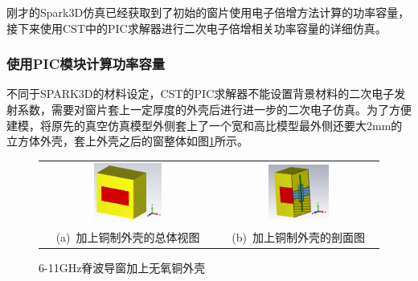 \documentclass[master]{thesis-uestc}
\begin{document}
刚才的Spark3D仿真已经获取到了初始的窗片使用电子倍增方法计算的功率容量，接下来使用CST中的PIC求解器进行二次电子倍增相关功率容量的详细仿真。

\subsubsection{使用PIC模块计算功率容量}
不同于SPARK3D的材料设定，CST的PIC求解器不能设置背景材料的二次电子发射系数，需要对窗片套上一定厚度的外壳后进行进一步的二次电子仿真。为了方便建模，将原先的真空仿真模型外侧套上了一个宽和高比模型最外侧还要大2mm的立方体外壳，套上外壳之后的窗整体如图\ref{fig:X无氧铜外壳}所示。


\begin{figure}[!htb]
    \small
    \centering
    \begin{tabular}{@{\ }c@{\ }c}
        \includegraphics[width=0.4\textwidth]{pic/chapter3/X脊波导窗无氧铜外壳.png} & 
        \hspace{5pt}
        \includegraphics[width=0.4\textwidth]{pic/chapter3/X铜制外壳剖面图.png}     \\
        \mbox{\small (a) 加上铜制外壳的总体视图}                                                                               & 
        \mbox{\small (b) 加上铜制外壳的剖面图}                                                                                  \\
    \end{tabular}
    \caption{6-11GHz脊波导窗加上无氧铜外壳}
    \label{fig:X无氧铜外壳}
\end{figure}
\end{document}
